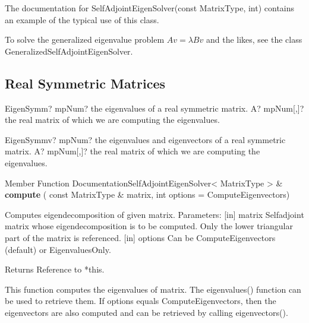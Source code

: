 The documentation for SelfAdjointEigenSolver(const MatrixType, int) contains an example of the typical use of this class.

To solve the generalized eigenvalue problem $A v = \lambda B v$ and the likes, see the class \textsf{GeneralizedSelfAdjointEigenSolver}.


\subsection{Real Symmetric Matrices}

\begin{mpFunctionsExtract}
	\mpFunctionOne
	{EigenSymm? mpNum? the eigenvalues of a real symmetric matrix.}
	{A? mpNum[,]? the real matrix of which we are computing the eigenvalues.}
\end{mpFunctionsExtract}

\vspace{0.6cm}
\begin{mpFunctionsExtract}
	\mpFunctionOne
	{EigenSymmv? mpNum? the eigenvalues and eigenvectors of a real symmetric matrix.}
	{A? mpNum[,]? the real matrix of which we are computing the eigenvalues.}
\end{mpFunctionsExtract}



%

\vspace{0.3cm}
Member Function DocumentationSelfAdjointEigenSolver< MatrixType > \& \textbf{compute}  ( const MatrixType \&  matrix,  int  options = ComputeEigenvectors)   

Computes eigendecomposition of given matrix. 
Parameters: 
[in] matrix Selfadjoint matrix whose eigendecomposition is to be computed. Only the lower triangular part of the matrix is referenced.  
[in] options Can be ComputeEigenvectors (default) or EigenvaluesOnly.  

Returns Reference to *this.

This function computes the eigenvalues of matrix. The eigenvalues() function can be used to retrieve them. If options equals ComputeEigenvectors, then the eigenvectors are also computed and can be retrieved by calling eigenvectors().

